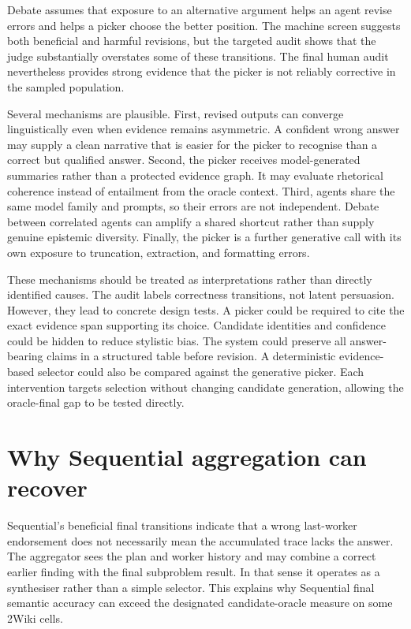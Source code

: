 Debate assumes that exposure to an alternative argument helps an agent revise errors and helps a picker choose the better position. The machine screen suggests both beneficial and harmful revisions, but the targeted audit shows that the judge substantially overstates some of these transitions. The final human audit nevertheless provides strong evidence that the picker is not reliably corrective in the sampled population.

Several mechanisms are plausible. First, revised outputs can converge linguistically even when evidence remains asymmetric. A confident wrong answer may supply a clean narrative that is easier for the picker to recognise than a correct but qualified answer. Second, the picker receives model-generated summaries rather than a protected evidence graph. It may evaluate rhetorical coherence instead of entailment from the oracle context. Third, agents share the same model family and prompts, so their errors are not independent. Debate between correlated agents can amplify a shared shortcut rather than supply genuine epistemic diversity. Finally, the picker is a further generative call with its own exposure to truncation, extraction, and formatting errors.

These mechanisms should be treated as interpretations rather than directly identified causes. The audit labels correctness transitions, not latent persuasion. However, they lead to concrete design tests. A picker could be required to cite the exact evidence span supporting its choice. Candidate identities and confidence could be hidden to reduce stylistic bias. The system could preserve all answer-bearing claims in a structured table before revision. A deterministic evidence-based selector could also be compared against the generative picker. Each intervention targets selection without changing candidate generation, allowing the oracle-final gap to be tested directly.

\section{Why Sequential aggregation can recover}

Sequential's beneficial final transitions indicate that a wrong last-worker endorsement does not necessarily mean the accumulated trace lacks the answer. The aggregator sees the plan and worker history and may combine a correct earlier finding with the final subproblem result. In that sense it operates as a synthesiser rather than a simple selector. This explains why Sequential final semantic accuracy can exceed the designated candidate-oracle measure on some 2Wiki cells.

